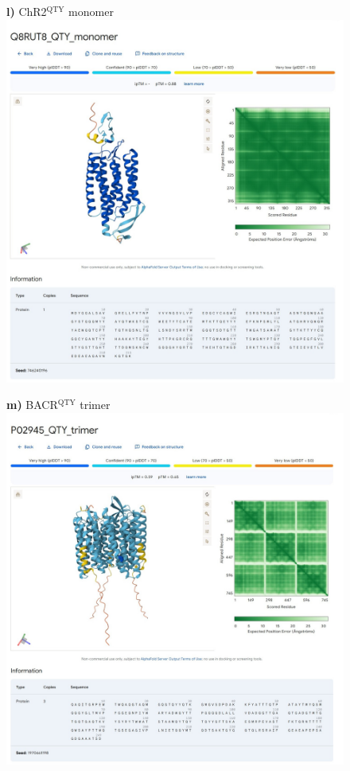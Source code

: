 \documentclass[fleqn,12pt]{supp}
\begin{document}
\newpage
\begin{figure}[H]
    \textbf{l)} ChR2$^{\textrm{QTY}}$ monomer \\
    \includegraphics[width=\linewidth]{FigureS2l.jpg}
\end{figure}

\newpage
\begin{figure}[H]
    \textbf{m)} BACR$^{\textrm{QTY}}$ trimer \\
    \includegraphics[width=\linewidth]{FigureS2m.jpg}
\end{figure}
\end{document}
